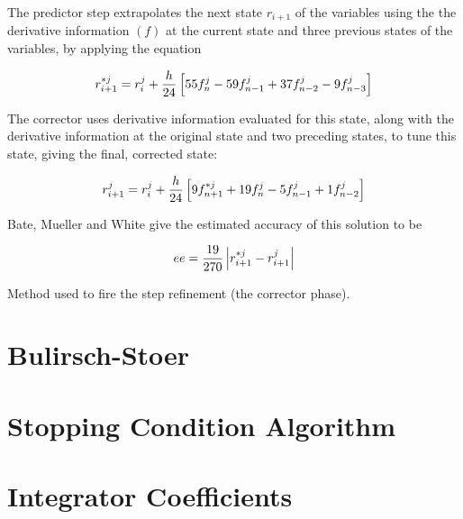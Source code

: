 The predictor step extrapolates the next state $r_{i+1}$ of the
variables using the the derivative information $(f)$ at the
current state and three  previous states of the variables, by
applying the equation

\[ r_{i+1}^{*j} = r_i^j + {{h}\over{24}}\left[55 f_n^j - 59 f_{n-1}^j + 37 f_{n-2}^j - 9 f_{n-3}^j \right] \]

The corrector uses derivative information evaluated for this
state, along  with the derivative information at the original
state and two preceding  states, to tune this state, giving the
final, corrected state:

\[ r_{i+1}^{j} = r_i^j + {{h}\over{24}}\left[9 f_{n+1}^{*j} + 19 f_{n}^j - 5 f_{n-1}^j + 1 f_{n-2}^j \right] \]

Bate, Mueller and White give the estimated accuracy of this
solution to be

\[ee = {{19}\over{270}} \left|r_{i+1}^{*j} - r_{i+1}^{j}\right|\]

Method used to fire the step refinement (the corrector phase).

\section{Bulirsch-Stoer} 

\section{Stopping Condition Algorithm} 

\section{Integrator Coefficients} 





%
